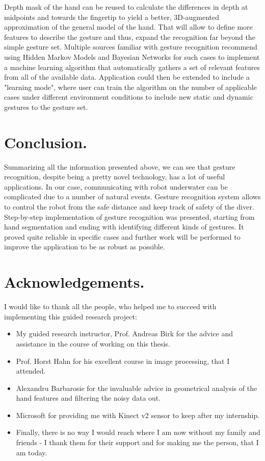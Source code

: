 \documentclass[a4paper,11pt,oneside]{article}
\begin{document}
Depth mask of the hand can be reused to calculate the differences in depth at midpoints and towards the fingertip to yield a better, 3D-augmented approximation of the general model of the hand. That will allow to define more features to describe the gesture and thus, expand the recognition far beyond the simple gesture set. Multiple sources familiar with gesture recognition recommend using Hidden Markov Models and Bayesian Networks \cite{ZG01} for such cases to implement a machine learning algorithm that automatically gathers a set of relevant features from all of the available data. Application could then be extended to include a "learning mode", where user can train the algorithm on the number of applicable cases under different environment conditions to include new static and dynamic gestures to the gesture set.

\section{Conclusion.}

Summarizing all the information presented above, we can see that gesture recognition, despite being a pretty novel technology, has a lot of useful applications. In our case, communicating with robot underwater can be complicated due to a number of natural events. Gesture recognition system allows to control the robot from the safe distance and keep track of safety of the diver. Step-by-step implementation of gesture recognition was presented, starting from hand segmentation and ending with identifying different kinds of gestures. It proved quite reliable in specific cases and further work will be performed to improve the application to be as robust as possible.  

\section{Acknowledgements.}
I would like to thank all the people, who helped me to succeed with implementing this guided research project:

\begin{itemize}
\item My guided research instructor, Prof. Andreas Birk for the advice and assistance in the course of working on this thesis.
\item Prof. Horst Hahn for his excellent course in image processing, that I attended.
\item Alexandru Barbarosie for the invaluable advice in geometrical analysis of the hand features and filtering the noisy data out. 
\item Microsoft for providing me with Kinect v2 sensor to keep after my internship. 
\item Finally, there is no way I would reach where I am now without my family and friends - I thank them for their support and for making me the person, that I am today.
\end{itemize}
\end{document}
